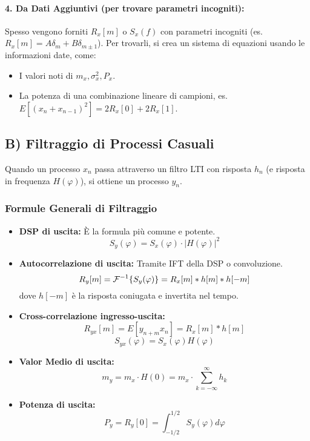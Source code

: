 \paragraph{4. Da Dati Aggiuntivi (per trovare parametri incogniti):}
Spesso vengono forniti $R_x[m]$ o $S_x(f)$ con parametri incogniti (es. $R_x[m] = A\delta_m + B\delta_{m\pm1}$). Per trovarli, si crea un sistema di equazioni usando le informazioni date, come:
\begin{itemize}
    \item I valori noti di $m_x, \sigma_x^2, P_x$.
    \item La potenza di una combinazione lineare di campioni, es. $E[(x_n+x_{n-1})^2] = 2R_x[0] + 2R_x[1]$.
\end{itemize}

\subsection{B) Filtraggio di Processi Casuali}
Quando un processo $x_n$ passa attraverso un filtro LTI con risposta $h_n$ (e risposta in frequenza $H(\varphi)$), si ottiene un processo $y_n$.

\subsubsection{Formule Generali di Filtraggio}
\begin{itemize}
    \item \textbf{DSP di uscita:} È la formula più comune e potente.
    $$ S_y(\varphi) = S_x(\varphi) \cdot |H(\varphi)|^2 $$
    \item \textbf{Autocorrelazione di uscita:} Tramite IFT della DSP o convoluzione.
    $$ R_y[m] = \mathcal{F}^{-1}\{S_y(\varphi)\} = R_x[m] * h[m] * h[-m] $$
    dove $h[-m]$ è la risposta coniugata e invertita nel tempo.
    \item \textbf{Cross-correlazione ingresso-uscita:}
    $$ R_{yx}[m] = E[y_{n+m}x_n] = R_x[m] * h[m] $$
    $$ S_{yx}(\varphi) = S_x(\varphi)H(\varphi) $$
    \item \textbf{Valor Medio di uscita:}
    $$ m_y = m_x \cdot H(0) = m_x \cdot \sum_{k=-\infty}^{\infty} h_k $$
    \item \textbf{Potenza di uscita:}
    $$ P_y = R_y[0] = \int_{-1/2}^{1/2} S_y(\varphi) d\varphi $$
\end{itemize}

